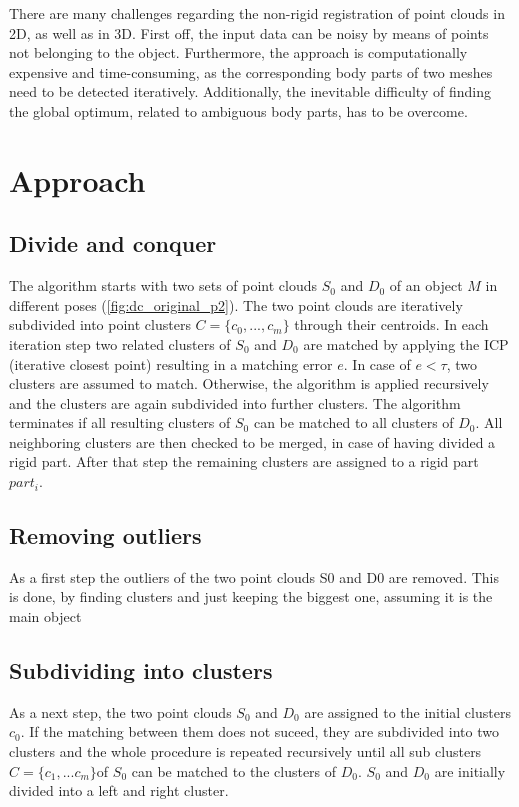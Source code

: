 There are many challenges regarding the non-rigid registration of point clouds in 2D, as well as in 3D. First off, the input data can be noisy by means of points not belonging to the object. Furthermore, the approach is computationally expensive and time-consuming, as the corresponding body parts of two meshes need to be detected iteratively. Additionally, the inevitable difficulty of finding the global optimum, related to ambiguous body parts, has to be overcome.

\section{Approach}
\label{divideAndConquer}

\subsection{Divide and conquer}

 The algorithm starts with two sets of point clouds $S_0$ and $D_0$ of an object $M$ in different poses (\ref{fig:dc_original_p2}). The two point clouds are iteratively subdivided into point clusters $ C =  \{ {c_0,..., c_m}\}$ through their centroids. In each iteration step two related clusters of $S_0$ and $D_0$ are matched by applying the ICP (iterative closest point) resulting in a matching error $e$. In case of $ e < \tau $, two clusters are assumed to match. Otherwise, the algorithm is applied recursively and the clusters are again subdivided into further clusters. The algorithm terminates if all resulting clusters of $S_0$ can be matched to all clusters of $D_0$. All neighboring clusters are then checked to be merged, in case of having divided a rigid part. After that step the remaining clusters are assigned to a rigid part $part_i$. 
 
 \subsection{Removing outliers}
 
 As a first step the outliers of the two point clouds S0 and D0 are removed. This is done, by finding clusters and just keeping the biggest one, assuming it is the main object
 
 \subsection{Subdividing into clusters}
 
 As a next step, the two point clouds $S_0$ and $D_0$ are assigned to the initial clusters $c_0$. If the matching between them does not suceed, they are subdivided into two clusters and the whole procedure is repeated recursively until all sub clusters $C = \{{c_1, ... c_m}\} $of $S_0$ can be matched to the clusters of $D_0$.  $S_0$ and $D_0$ are initially divided into a left and right cluster. 
 

